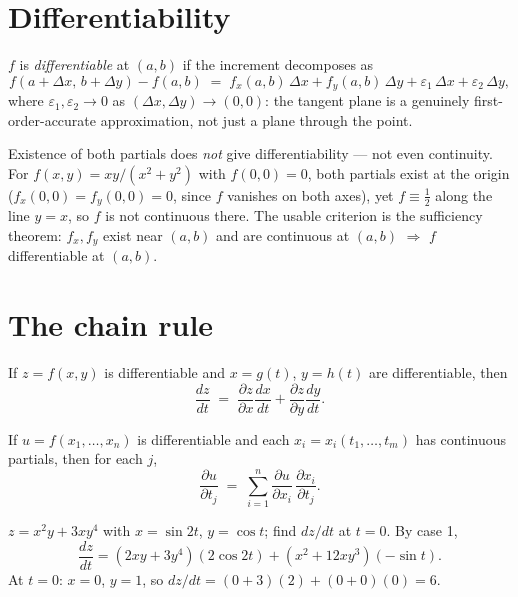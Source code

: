 \section{Differentiability}

\begin{defn}[Differentiable]
$f$ is \emph{differentiable} at $(a,b)$ if the increment decomposes as
\[
  f(a+\Delta x,\, b+\Delta y) - f(a,b)
  \;=\; f_x(a,b)\,\Delta x + f_y(a,b)\,\Delta y
        + \varepsilon_1\,\Delta x + \varepsilon_2\,\Delta y,
\]
where $\varepsilon_1,\varepsilon_2 \to 0$ as $(\Delta x,\Delta y)\to(0,0)$: the tangent plane is
a genuinely first-order-accurate approximation, not just a plane through the point.
\end{defn}

\begin{warning}
Existence of both partials does \emph{not} give differentiability --- not even continuity. For
$f(x,y) = xy/(x^2+y^2)$ with $f(0,0)=0$, both partials exist at the origin
($f_x(0,0)=f_y(0,0)=0$, since $f$ vanishes on both axes), yet $f \equiv \tfrac12$ along the line
$y=x$, so $f$ is not continuous there. The usable criterion is the sufficiency theorem:
$f_x, f_y$ exist near $(a,b)$ and are continuous at $(a,b)$ $\Rightarrow$ $f$ differentiable
at $(a,b)$.
\end{warning}

\section{The chain rule}

\begin{thm}
If $z = f(x,y)$ is differentiable and $x = g(t)$, $y = h(t)$ are differentiable, then
\[
  \frac{dz}{dt} \;=\; \frac{\partial z}{\partial x}\frac{dx}{dt}
                    + \frac{\partial z}{\partial y}\frac{dy}{dt}.
\]
\end{thm}

\begin{thm}
If $u = f(x_1,\dots,x_n)$ is differentiable and each $x_i = x_i(t_1,\dots,t_m)$ has continuous
partials, then for each $j$,
\[
  \frac{\partial u}{\partial t_j}
  \;=\; \sum_{i=1}^{n} \frac{\partial u}{\partial x_i}\,\frac{\partial x_i}{\partial t_j}.
\]
\end{thm}

\begin{example}
$z = x^2 y + 3x y^4$ with $x = \sin 2t$, $y = \cos t$; find $dz/dt$ at $t=0$. By case 1,
\[
  \frac{dz}{dt} = (2xy + 3y^4)(2\cos 2t) + (x^2 + 12xy^3)(-\sin t).
\]
At $t=0$: $x=0$, $y=1$, so $dz/dt = (0+3)(2) + (0+0)(0) = 6$.
\end{example}

